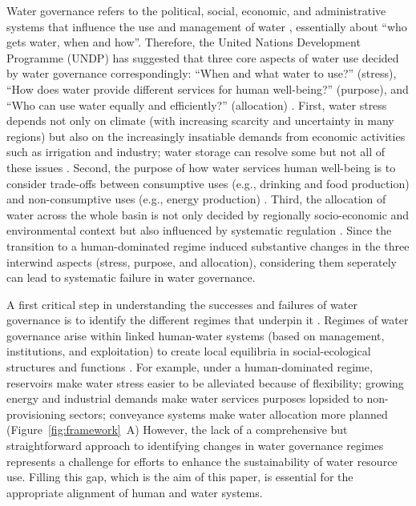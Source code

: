\documentclass[draft]{agujournal2019}
\begin{document}
Water governance refers to the political, social, economic, and administrative systems that influence the use and management of water \cite{oecd2018, wang2017}, essentially about ``who gets water, when and how''\cite{lasswell2018}.
Therefore, the United Nations Development Programme (UNDP) has suggested that three core aspects of water use decided by water governance correspondingly: ``When and what water to use?'' (stress), ``How does water provide different services for human well-being?'' (purpose), and ``Who can use water equally and efficiently?'' (allocation)
\cite{undpwatergovernancefacility2016}.
First, water stress depends not only on climate (with increasing scarcity and uncertainty in many regions) but also on the increasingly insatiable demands from economic activities such as irrigation and industry; water storage can resolve some but not all of these issues
\cite{qin2019,wada2014,huang2021}.
Second, the purpose of how water services human well-being is to consider trade-offs between consumptive uses (e.g., drinking and food production) and non-consumptive uses (e.g., energy production)
\cite{liu2017,florke2018,jaeger2019}.
Third, the allocation of water across the whole basin is not only decided by regionally socio-economic and environmental context but also influenced by systematic regulation
\cite{schmandt2021,speed2013}.
Since the transition to a human-dominated regime induced substantive changes in the three interwind aspects (stress, purpose, and allocation), considering them seperately can lead to systematic failure in water governance.

A first critical step in understanding the successes and failures of water governance is to identify the different regimes that underpin it \cite{kjellen2015, grafton2013}.
Regimes of water governance arise within linked human-water systems (based on management, institutions, and exploitation) to create local equilibria in social-ecological structures and functions
\cite{falkenmark2021,bressers2013,loch2020}.
For example, under a human-dominated regime, reservoirs make water stress easier to be alleviated because of flexibility; growing energy and industrial demands make water services purposes lopsided to non-provisioning sectors; conveyance systems make water allocation more planned (Figure~\ref{fig:framework}~A)
However, the lack of a comprehensive but straightforward approach to identifying changes in water governance regimes represents a challenge for efforts to enhance the sustainability of water resource use.
Filling this gap, which is the aim of this paper, is essential for the appropriate alignment of human and water systems.
\end{document}
